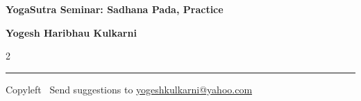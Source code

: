\documentclass[9pt,a4paper,landscape]{article}
\begin{document}
\footnotesize

\begin{center}
\Large{\textbf{YogaSutra Seminar: Sadhana Pada, Practice}}

\small{\textbf{Yogesh Haribhau Kulkarni}}
\end{center}

\begin{multicols}{2}

\end{multicols}

\rule{\linewidth}{0.25pt}
\scriptsize
Copyleft \textcopyleft\  Send suggestions to
\href{http://www.yogeshkulkarni.com}{yogeshkulkarni@yahoo.com}
\end{document}
